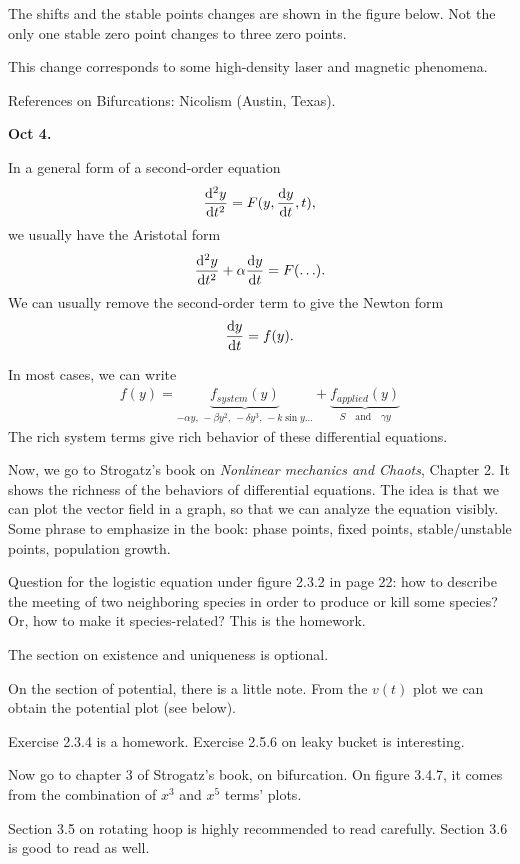 The shifts and the stable points changes are shown in the figure below. Not the only one stable zero point changes to three zero points.


This change corresponds to some high-density laser and magnetic phenomena. 

References on Bifurcations: Nicolism (Austin, Texas). 


\textbf{Oct 4.}

In a general form of a second-order equation
\begin{align}
\frac{{\mathrm d}^2 {y}}{{\mathrm d}t^2}= F(y,\frac{{\mathrm d} {y}}{{\mathrm d}t},t),
\end{align}
we usually have the Aristotal form
\begin{align}
\frac{{\mathrm d}^2 {y}}{{\mathrm d}t^2} + \alpha \frac{{\mathrm d} {y}}{{\mathrm d}t} =F(\ldots).
\end{align}
We can usually remove the second-order term to give the Newton form
\begin{align}
\frac{{\mathrm d} {y}}{{\mathrm d}t}=f(y).
\end{align}

In most cases, we can write
\begin{align}
f(y)= \underbrace{f_{system}(y)}_{-\alpha y,\, -\beta y^2,\, -\delta y^3,\, -k\sin y\ldots}+ \underbrace{f_{applied}(y)}_{S\quad \textrm{and} \quad \gamma y}
\end{align}
The rich system terms give rich behavior of these differential equations. 

Now, we go to Strogatz's book on \textit{Nonlinear mechanics and Chaots}, Chapter 2. It shows the richness of the behaviors of differential equations. The idea is that we can plot the vector field in a graph, so that we can analyze the equation visibly. Some phrase to emphasize in the book: phase points, fixed points, stable/unstable points, population growth.

Question for the logistic equation under figure 2.3.2 in page 22: how to describe the meeting of two neighboring species in order to produce or kill some species?  Or, how to make it species-related? This is the homework.

The section on existence and uniqueness is optional. 

On the section of potential, there is a little note. From the $ v(t) $ plot we can obtain the potential plot (see below).


Exercise 2.3.4 is a homework. Exercise 2.5.6 on leaky bucket is interesting. 

Now go to chapter 3 of Strogatz's book, on bifurcation. On figure 3.4.7, it comes from the combination of $ x^3 $ and $ x^5 $ terms' plots. 


Section 3.5 on rotating hoop is highly recommended to read carefully. Section 3.6 is good to read as well. 

